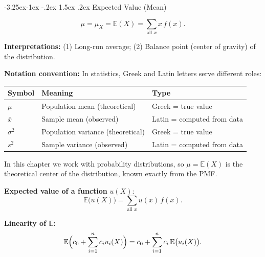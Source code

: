 \documentclass{article}
\makeatletter
\theoremstyle{remark}
\newlength{\subsecindent}
\renewcommand\subsection{\@startsection{subsection}{2}{\subsecindent}%
  {-3.25ex\@plus -1ex \@minus -.2ex}%
  {1.5ex \@plus .2ex}%
  {\normalfont\large\bfseries}}
\newenvironment{sub}{%
  \begin{list}{}{%
    \setlength{\leftmargin}{4em}%
    \setlength{\rightmargin}{0pt}%
    \setlength{\topsep}{0pt}%
    \setlength{\partopsep}{0pt}%
    \setlength{\parsep}{\parskip}%
    \setlength{\itemsep}{\parskip}%
  }\item\relax
}{\end{list}}
\newcommand{\E}{\mathbb{E}}
\makeatother
\begin{document}
\subsection{Expected Value (Mean)}
\begin{sub}

\[
  \boxed{\mu = \mu_X = \E(X) = \sum_{\text{all } x} x \, f(x).}
\]

\textbf{Interpretations:} (1) Long-run average; (2) Balance point (center of gravity) of the distribution.

\textbf{Notation convention:} In statistics, Greek and Latin letters serve different roles:
\begin{center}
\begin{tabular}{lll}
\toprule
\textbf{Symbol} & \textbf{Meaning} & \textbf{Type} \\
\midrule
$\mu$        & Population mean (theoretical)  & Greek = true value \\
$\bar{x}$    & Sample mean (observed)         & Latin = computed from data \\
$\sigma^2$   & Population variance (theoretical) & Greek = true value \\
$s^2$        & Sample variance (observed)     & Latin = computed from data \\
\bottomrule
\end{tabular}
\end{center}
In this chapter we work with probability distributions, so $\mu = \E(X)$ is the
theoretical center of the distribution, known exactly from the PMF.

\textbf{Expected value of a function} $u(X)$:
\[
  \boxed{\E\bigl(u(X)\bigr) = \sum_{\text{all } x} u(x) \, f(x).}
\]

\textbf{Linearity of $\E$:}
\[
  \E\Bigl(c_0 + \sum_{i=1}^n c_i u_i(X)\Bigr) = c_0 + \sum_{i=1}^n c_i \, \E\bigl(u_i(X)\bigr).
\]

\end{sub}
\end{document}
